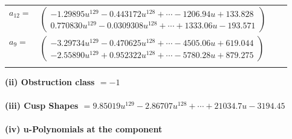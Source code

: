 \documentclass[1p]{elsarticle_modified}
\theoremstyle{definition}
\begin{document}
\begin{tabular}{m{7pt} m{180pt} m{7pt} m{180pt} }
\flushright $a_{12}=$&$\begin{pmatrix}-1.29895 u^{129}-0.443172 u^{128}+\cdots-1206.94 u+133.828\\0.770830 u^{129}-0.0309308 u^{128}+\cdots+1333.06 u-193.571\end{pmatrix}$ \\
\flushright $a_{9}=$&$\begin{pmatrix}-3.29734 u^{129}-0.470625 u^{128}+\cdots-4505.06 u+619.044\\-2.55890 u^{129}+0.952322 u^{128}+\cdots-5780.28 u+879.275\end{pmatrix}$\\&\end{tabular}
\flushleft \textbf{(ii) Obstruction class $= -1$}\\~\\
\flushleft \textbf{(iii) Cusp Shapes $= 9.85019 u^{129}-2.86707 u^{128}+\cdots+21034.7 u-3194.45$}\\~\\
\newpage\renewcommand{\arraystretch}{1}
\flushleft \textbf{(iv) u-Polynomials at the component}\newline \\
\end{document}
